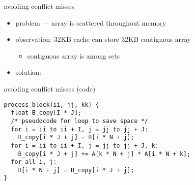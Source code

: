 \begin{frame}[fragile,label=noConflict]{avoiding conflict misses}
\begin{itemize}
\item problem --- array is scattered throughout memory
\item observation: 32KB cache can store 32KB contiguous array
    \begin{itemize}
    \item contiguous array is  among sets
    \end{itemize}
\item solution: 
\end{itemize}
\end{frame}

\begin{frame}[fragile,label=noConflictCopy]{avoiding conflict misses (code)}
\begin{lstlisting}[style=small]
process_block(ii, jj, kk) {
  float B_copy[I * J];
  /* pseudocode for loop to save space */
  for i = ii to ii + I, j = jj to jj + J:
    B_copy[i * J + j] = B[i * N + j];
  for i = ii to ii + I, j = jj to jj + J, k:
    B_copy[i * J + j] += A[k * N + j] * A[i * N + k];
  for all i, j:
    B[i * N + j] = B_copy[i * J + j];
}
\end{lstlisting}
\end{frame}

